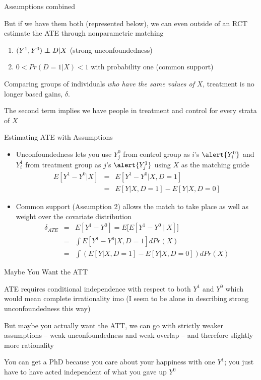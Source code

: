 \documentclass{beamer}
\newcommand\independent{\protect\mathpalette{\protect\independenT}{\perp}}
\def\independenT#1#2{\mathrel{\rlap{$#1#2$}\mkern2mu{#1#2}}}
\begin{document}
\begin{frame}{Assumptions combined}
	
But if we have them both (represented below), we can even outside of an RCT estimate the ATE through nonparametric matching
  \begin{enumerate}
		\item $(Y^1,Y^0) \independent{D} | X$ (strong unconfoundedness)
		\item $0<Pr(D=1|X)<1$ with probability one (common support)
  \end{enumerate}

\bigskip
Comparing groups of individuals \emph{who have the same values of} $X$, treatment is no longer based gains, $\delta$. 

\bigskip

The second term implies we have people in treatment and control for every strata of $X$
\end{frame}


\begin{frame}{Estimating ATE with Assumptions}


	\begin{itemize}
	\item Unconfoundedness lets you use $Y^0_j$ from control group as $i$'s $\alert{Y^0_i}$ and $Y^1_i$ from treatment group as $j$'s $\alert{Y^1_j}$ using $X$ as the matching guide
		\begin{eqnarray*}
		E[Y^1-Y^0|X] &=& E[Y^1 - Y^0 | X,D=1] \\
		&=&E[Y|X,D=1] - E[Y|X,D=0]
		\end{eqnarray*}
	\item Common support (Assumption 2) allows the match to take place as well as weight over the covariate distribution
		\begin{eqnarray*}
		\delta_{ATE} &=&E[Y^1-Y^0] = E\bigg[ E[Y^1 - Y^0 \ \vert \ X] \bigg] \\
		&=& \int E[Y^1 - Y^0 |X,D=1] dPr(X) \\
		&=& \int \left(E[Y|X,D=1] - E[Y|X,D=0]\right)dPr(X)
		\end{eqnarray*}
	\end{itemize}

\end{frame}



\begin{frame}{Maybe You Want the ATT}

ATE requires conditional independence with respect to both $Y^1$ and $Y^0$ which would mean complete irrationality imo (I seem to be alone in describing strong unconfoundedness this way)

\bigskip

But maybe you actually want the ATT, we can go with strictly weaker assumptions -- weak unconfoundedness and weak overlap -- and therefore slightly more rationality

\bigskip

You can get a PhD because you care about your happiness with one $Y^1$; you just have to have acted independent of what you gave up $Y^0$

\end{frame}
\end{document}

